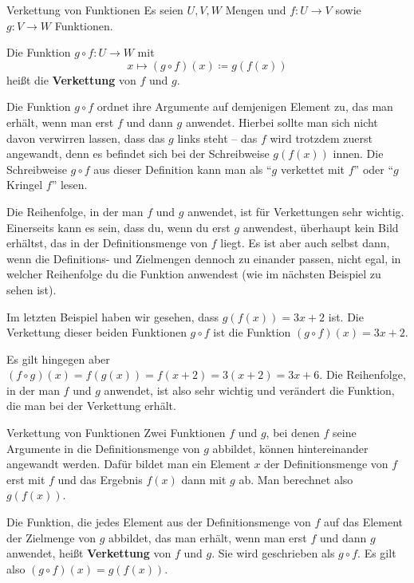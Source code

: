 \documentclass[../../main.tex]{subfiles}
\begin{document}
\begin{definition}{Verkettung von Funktionen}
    Es seien $U,V,W$ Mengen und $f\colon U\rightarrow V$ sowie $g\colon V\rightarrow W$ Funktionen.
    
    Die Funktion $g\circ f\colon U\rightarrow W$ mit \[x\mapsto (g\circ f)(x)\coloneqq g(f(x))\] heißt die \textbf{Verkettung} von $f$ und $g$.
\end{definition}

Die Funktion $g\circ f$ ordnet ihre Argumente auf demjenigen Element zu, das man erhält, wenn man erst $f$ und dann $g$ anwendet. Hierbei sollte man sich nicht davon verwirren lassen, dass das $g$ links steht -- das $f$ wird trotzdem zuerst angewandt, denn es befindet sich bei der Schreibweise $g(f(x))$ innen. Die Schreibweise $g\circ f$ aus dieser Definition kann man als \enquote{$g$ verkettet mit $f$} oder \enquote{$g$ Kringel $f$} lesen.

Die Reihenfolge, in der man $f$ und $g$ anwendet, ist für Verkettungen sehr wichtig. Einerseits kann es sein, dass du, wenn du erst $g$ anwendest, überhaupt kein Bild erhältst, das in der Definitionsmenge von $f$ liegt. Es ist aber auch selbst dann, wenn die Definitions- und Zielmengen dennoch zu einander passen, nicht egal, in welcher Reihenfolge du die Funktion anwendest (wie im nächsten Beispiel zu sehen ist).

\begin{example}{}
    Im letzten Beispiel haben wir gesehen, dass $g(f(x))=3x+2$ ist. Die Verkettung dieser beiden Funktionen $g\circ f$ ist die Funktion $(g\circ f)(x)=3x+2$.
    
    Es gilt hingegen aber $(f\circ g)(x)=f(g(x))=f(x+2)=3(x+2)=3x+6$. Die Reihenfolge, in der man $f$ und $g$ anwendet, ist also sehr wichtig und verändert die Funktion, die man bei der Verkettung erhält.
\end{example}

\begin{nutshell}{Verkettung von Funktionen}
    \parpic[r]{}
    Zwei Funktionen $f$ und $g$, bei denen $f$ seine Argumente in die Definitionsmenge von $g$ abbildet, können hintereinander angewandt werden. Dafür bildet man ein Element $x$ der Definitionsmenge von $f$ erst mit $f$ und das Ergebnis $f(x)$ dann mit $g$ ab. Man berechnet also $g(f(x))$.
      
    Die Funktion, die jedes Element aus der Definitionsmenge von $f$ auf das Element der Zielmenge von $g$ abbildet, das man erhält, wenn man erst $f$ und dann $g$ anwendet, heißt \textbf{Verkettung} von $f$ und $g$. Sie wird geschrieben als $g\circ f$. Es gilt also $(g\circ f)(x)=g(f(x))$.
\end{nutshell}
\end{document}
